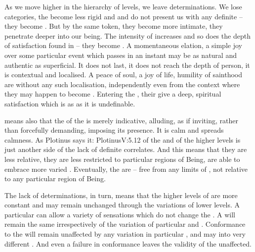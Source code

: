 \pa\label{pa:SchelerA}
As we move higher in the hierarchy of levels, we leave 
determinations.  We lose  categories, the
 become less rigid and  and do not present us
with any definite  -- they become .  But by the
same token, they become more intimate, they penetrate deeper into our
being.  The intensity of  increases and so does the depth of
satisfaction found in  -- they become .  
A momentaneous elation, a simple joy over some particular event which passes in
an instant may be as natural and authentic as superficial.  It does not last, it
does not reach the depth of person, it is contextual and localised.  A peace of
soul, a joy of life, humility of sainthood are  without any such 
localisation, independently even from the context where they may happen to become
. Entering the \hoa, their
 give a deep, spiritual satisfaction which is as  as it is
undefinable. 

 means also that the  of the  is merely
indicative, alluding, as if inviting, rather than forcefully demanding, imposing
its  presence. It is calm and spreads calmness.  As Plotinus says
it: \citet{The Good is gentle and friendly and tender, and we have it present
  when we but will.}{Plotinus}{V:5.12}   of the  and
 of the higher levels is just another side of the lack of
definite  correlates.  And this means that they are less relative,
they are less restricted to particular regions of Being, are able to embrace
more varied .  Eventually, the  are 
-- free from any limits of , not relative to any particular
region of Being.

\label{pa:constantVaried} The lack of  
determinations, in turn, means that the higher levels of  are
more constant and may remain unchanged through the variations of lower levels.
A particular  can allow a variety of sensations which do not change the
.  A  will remain the same irrespectively of the
variation of particular  and .  Conformance to the
 will remain unaffected by any
variation in particular ,  and may  into
very different . And even a failure in
conformance leaves the validity of the  unaffected.


